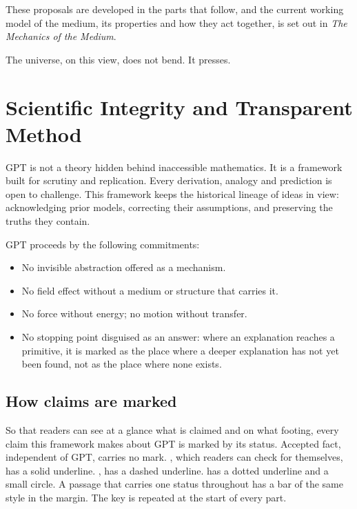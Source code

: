 These proposals are developed in the parts that follow, and the current working model of the medium, its properties and how they act together, is set out in \emph{The Mechanics of the Medium}.

The universe, on this view, does not bend. It presses.

\section{Scientific Integrity and Transparent Method}

GPT is not a theory hidden behind inaccessible mathematics. It is a framework built for scrutiny and replication. Every derivation, analogy and prediction is open to challenge. This framework keeps the historical lineage of ideas in view: acknowledging prior models, correcting their assumptions, and preserving the truths they contain.

GPT proceeds by the following commitments:

\begin{itemize}
  \item No invisible abstraction offered as a mechanism.
  \item No field effect without a medium or structure that carries it.
  \item No force without energy; no motion without transfer.
  \item No stopping point disguised as an answer: where an explanation reaches a primitive, it is marked as the place where a deeper explanation has not yet been found, not as the place where none exists.
\end{itemize}

\subsection*{How claims are marked}

So that readers can see at a glance what is claimed and on what footing, every claim this framework makes about GPT is marked by its status. Accepted fact, independent of GPT, carries no mark. , which readers can check for themselves, has a solid underline. , has a dashed underline.  has a dotted underline and a small circle. A passage that carries one status throughout has a bar of the same style in the margin. The key is repeated at the start of every part.

